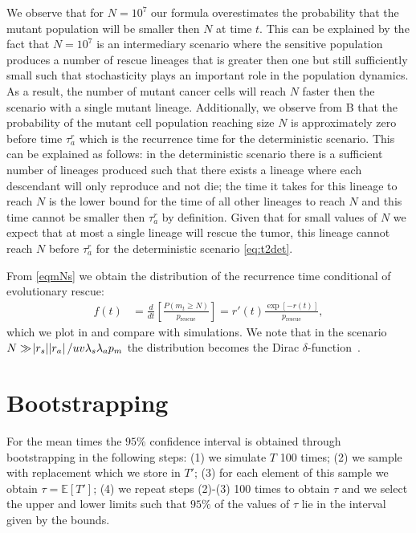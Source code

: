 \documentclass[12pt]{extarticle}
\newcommand{\presc}{p_\text{rescue}}
\renewcommand{\Delta}{r}
\begin{document}
\begin{appendices}
We observe that for $N=10^7$ our formula overestimates the probability that the mutant population will be smaller then $N$ at time $t$.  This can be explained by the fact that $N=10^7$ is an intermediary scenario where the sensitive population produces a number of rescue lineages that is greater then one but still sufficiently small such that stochasticity plays an important role in the population dynamics. As a result, the number of mutant cancer cells will reach $N$ faster then the scenario with a single mutant lineage. Additionally, we observe from B that the probability of the mutant cell population reaching size $N$ is approximately zero before time $\tau_a^r$ which is the recurrence time for the deterministic scenario. This can be explained as follows: in the deterministic scenario there is a sufficient number of lineages produced such that there exists a lineage where each descendant will only reproduce and not die; the time it takes for this lineage to reach $N$ is the lower bound for the time of all other lineages to reach $N$ and this time cannot be smaller then $\tau_a^r$ by definition. Given that for small values of $N$ we expect that at most a single lineage will rescue the tumor, this lineage cannot reach $N$ before $\tau_a^r$ for the deterministic scenario \cref{eq:t2det}.

From  \cref{eqmNs} we obtain the distribution of the recurrence time conditional of evolutionary rescue: %
\begin{align}\label{distribution}
f\left(t\right)&=\frac{d}{dt}\left[\frac{P\left(m_t\geq N\right)}{\presc}\right]=r'\left(t\right)\frac{\exp\left[-r\left(t\right)\right]}{\presc},
\end{align}
which we plot in  and compare with simulations. We note that in the scenario $N\gg\abs{\Delta_s}\abs{\Delta_a}/uv\lambda_s\lambda_ap_m$ the distribution becomes the Dirac $\delta$-function~\citep{barton1989elements}.
\section{Bootstrapping}
For the mean times the $95\%$ confidence interval is obtained through bootstrapping in the following steps: (1) we simulate $T$ 100 times; (2) we sample with replacement which we store in $T'$; (3) for each element of this sample we obtain $\tau=\mathbb{E}\left[T'\right]$; (4) we repeat steps (2)-(3) 100 times to obtain $\tau$ and we select the upper and lower limits such that $95\%$ of the values of $\tau$ lie in the interval given by the bounds.


\end{appendices}
\end{document}
